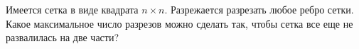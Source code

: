 Имеется сетка в виде квадрата $n \times n$. Разрежается разрезать любое ребро сетки. Какое максимальное
число разрезов можно сделать так, чтобы сетка все еще не развалилась на две части?
